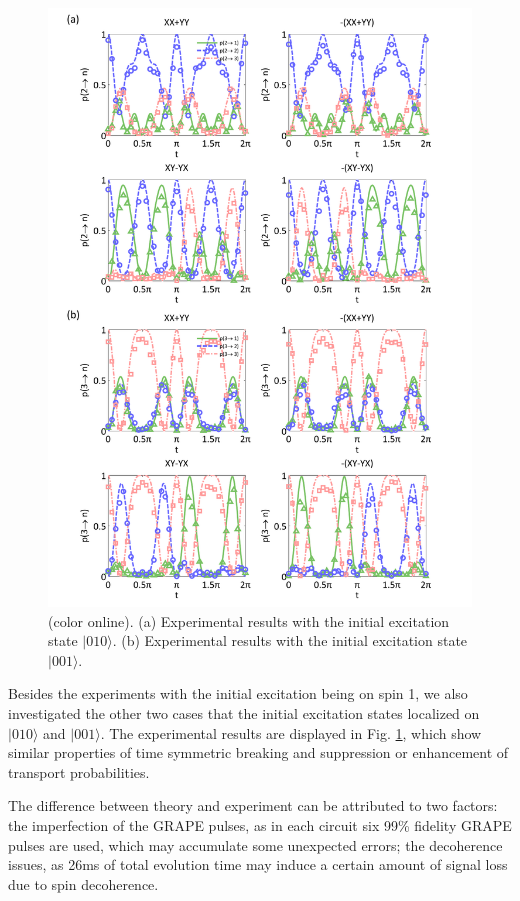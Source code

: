 \documentclass[aps,pra,12pt,nofootinbib,superscriptaddress,longbibliography,showpacs]{revtex4-1}
\theoremstyle{plain}
\theoremstyle{definition}
\newcommand{\ket}[1]{\ensuremath{|#1\rangle}}
\begin{document}
\begin{figure}[h] \centering
\includegraphics[width=0.9\columnwidth]{exp_23.pdf}
\caption{(color online). (a) Experimental results with the initial excitation state $\ket{010}$. (b) Experimental results with the initial excitation state $\ket{001}$.}\label{exp_23}
\end{figure}

Besides the experiments with the initial excitation being on spin 1, we also investigated the other two cases that the initial excitation states localized on $\ket{010}$ and $\ket{001}$. The experimental results are displayed in Fig.  \ref{exp_23}, which show similar properties of time symmetric breaking and suppression or enhancement of transport probabilities.

The difference between theory and experiment can be attributed to two factors: the imperfection of the GRAPE pulses, as in each circuit six 99\% fidelity GRAPE pulses are used, which may accumulate some unexpected errors; the decoherence issues, as 26ms of total evolution time may induce a certain amount of signal loss due to spin decoherence. 
\end{document}
